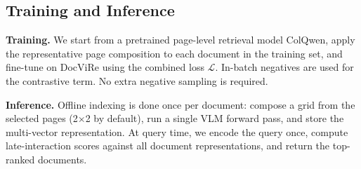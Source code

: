 \subsection{Training and Inference}

\textbf{Training.} We start from a pretrained page-level retrieval model ColQwen, apply the representative page composition to each document in the training set, and fine-tune on DocViRe using the combined loss $\mathcal{L}$. In-batch negatives are used for the contrastive term. No extra negative sampling is required.

\textbf{Inference.} Offline indexing is done once per document: compose a grid from the selected pages (2$\times$2 by default), run a single VLM forward pass, and store the multi-vector representation. At query time, we encode the query once, compute late-interaction scores against all document representations, and return the top-ranked documents.

